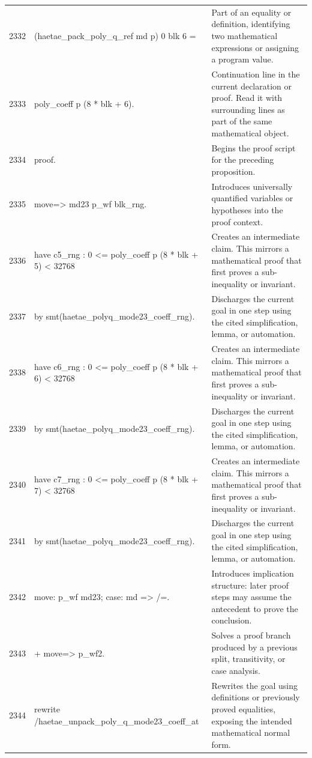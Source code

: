 \documentclass[10pt]{article}
\begin{document}
\begin{longtable}{r L{0.53\textwidth} L{0.37\textwidth}}
2332 & {\ttfamily\scriptsize     (haetae\_pack\_poly\_q\_ref md p) 0 blk 6 =} & Part of an equality or definition, identifying two mathematical expressions or assigning a program value. \\
2333 & {\ttfamily\scriptsize   poly\_coeff p (8 * blk + 6).} & Continuation line in the current declaration or proof.  Read it with surrounding lines as part of the same mathematical object. \\
2334 & {\ttfamily\scriptsize proof.} & Begins the proof script for the preceding proposition. \\
2335 & {\ttfamily\scriptsize move=> md23 p\_wf blk\_rng.} & Introduces universally quantified variables or hypotheses into the proof context. \\
2336 & {\ttfamily\scriptsize have c5\_rng : 0 <= poly\_coeff p (8 * blk + 5) < 32768} & Creates an intermediate claim.  This mirrors a mathematical proof that first proves a sub-inequality or invariant. \\
2337 & {\ttfamily\scriptsize   by smt(haetae\_polyq\_mode23\_coeff\_rng).} & Discharges the current goal in one step using the cited simplification, lemma, or automation. \\
2338 & {\ttfamily\scriptsize have c6\_rng : 0 <= poly\_coeff p (8 * blk + 6) < 32768} & Creates an intermediate claim.  This mirrors a mathematical proof that first proves a sub-inequality or invariant. \\
2339 & {\ttfamily\scriptsize   by smt(haetae\_polyq\_mode23\_coeff\_rng).} & Discharges the current goal in one step using the cited simplification, lemma, or automation. \\
2340 & {\ttfamily\scriptsize have c7\_rng : 0 <= poly\_coeff p (8 * blk + 7) < 32768} & Creates an intermediate claim.  This mirrors a mathematical proof that first proves a sub-inequality or invariant. \\
2341 & {\ttfamily\scriptsize   by smt(haetae\_polyq\_mode23\_coeff\_rng).} & Discharges the current goal in one step using the cited simplification, lemma, or automation. \\
2342 & {\ttfamily\scriptsize move: p\_wf md23; case: md => /=.} & Introduces implication structure: later proof steps may assume the antecedent to prove the conclusion. \\
2343 & {\ttfamily\scriptsize + move=> p\_wf2.} & Solves a proof branch produced by a previous split, transitivity, or case analysis. \\
2344 & {\ttfamily\scriptsize   rewrite /haetae\_unpack\_poly\_q\_mode23\_coeff\_at} & Rewrites the goal using definitions or previously proved equalities, exposing the intended mathematical normal form. \\

\end{longtable}
\end{document}

